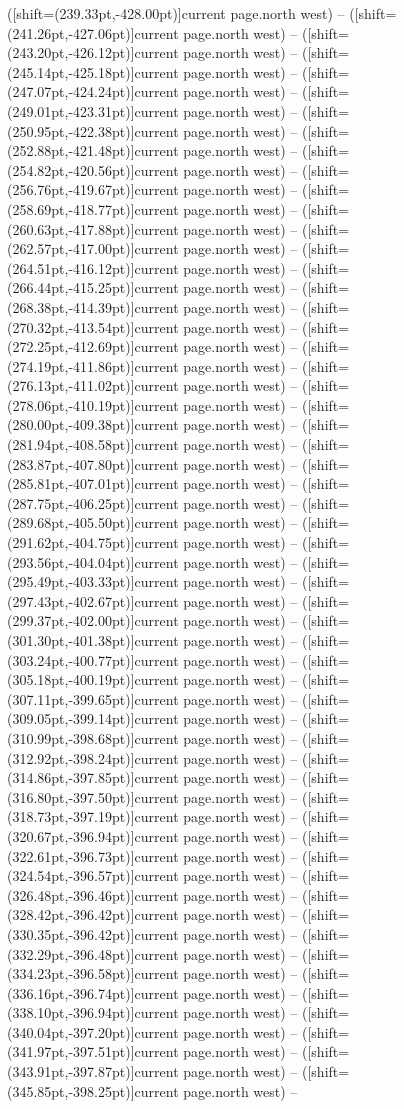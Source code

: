 \documentclass[11pt]{article}
\begin{document}
([shift={(239.33pt,-428.00pt)}]current page.north west) -- ([shift={(241.26pt,-427.06pt)}]current page.north west) -- ([shift={(243.20pt,-426.12pt)}]current page.north west) -- ([shift={(245.14pt,-425.18pt)}]current page.north west) -- ([shift={(247.07pt,-424.24pt)}]current page.north west) -- ([shift={(249.01pt,-423.31pt)}]current page.north west) -- ([shift={(250.95pt,-422.38pt)}]current page.north west) -- ([shift={(252.88pt,-421.48pt)}]current page.north west) -- ([shift={(254.82pt,-420.56pt)}]current page.north west) -- ([shift={(256.76pt,-419.67pt)}]current page.north west) -- ([shift={(258.69pt,-418.77pt)}]current page.north west) -- ([shift={(260.63pt,-417.88pt)}]current page.north west) -- ([shift={(262.57pt,-417.00pt)}]current page.north west) -- ([shift={(264.51pt,-416.12pt)}]current page.north west) -- ([shift={(266.44pt,-415.25pt)}]current page.north west) -- ([shift={(268.38pt,-414.39pt)}]current page.north west) -- ([shift={(270.32pt,-413.54pt)}]current page.north west) -- ([shift={(272.25pt,-412.69pt)}]current page.north west) -- ([shift={(274.19pt,-411.86pt)}]current page.north west) -- ([shift={(276.13pt,-411.02pt)}]current page.north west) -- ([shift={(278.06pt,-410.19pt)}]current page.north west) -- ([shift={(280.00pt,-409.38pt)}]current page.north west) -- ([shift={(281.94pt,-408.58pt)}]current page.north west) -- ([shift={(283.87pt,-407.80pt)}]current page.north west) -- ([shift={(285.81pt,-407.01pt)}]current page.north west) -- ([shift={(287.75pt,-406.25pt)}]current page.north west) -- ([shift={(289.68pt,-405.50pt)}]current page.north west) -- ([shift={(291.62pt,-404.75pt)}]current page.north west) -- ([shift={(293.56pt,-404.04pt)}]current page.north west) -- ([shift={(295.49pt,-403.33pt)}]current page.north west) -- ([shift={(297.43pt,-402.67pt)}]current page.north west) -- ([shift={(299.37pt,-402.00pt)}]current page.north west) -- ([shift={(301.30pt,-401.38pt)}]current page.north west) -- ([shift={(303.24pt,-400.77pt)}]current page.north west) -- ([shift={(305.18pt,-400.19pt)}]current page.north west) -- ([shift={(307.11pt,-399.65pt)}]current page.north west) -- ([shift={(309.05pt,-399.14pt)}]current page.north west) -- ([shift={(310.99pt,-398.68pt)}]current page.north west) -- ([shift={(312.92pt,-398.24pt)}]current page.north west) -- ([shift={(314.86pt,-397.85pt)}]current page.north west) -- ([shift={(316.80pt,-397.50pt)}]current page.north west) -- ([shift={(318.73pt,-397.19pt)}]current page.north west) -- ([shift={(320.67pt,-396.94pt)}]current page.north west) -- ([shift={(322.61pt,-396.73pt)}]current page.north west) -- ([shift={(324.54pt,-396.57pt)}]current page.north west) -- ([shift={(326.48pt,-396.46pt)}]current page.north west) -- ([shift={(328.42pt,-396.42pt)}]current page.north west) -- ([shift={(330.35pt,-396.42pt)}]current page.north west) -- ([shift={(332.29pt,-396.48pt)}]current page.north west) -- ([shift={(334.23pt,-396.58pt)}]current page.north west) -- ([shift={(336.16pt,-396.74pt)}]current page.north west) -- ([shift={(338.10pt,-396.94pt)}]current page.north west) -- ([shift={(340.04pt,-397.20pt)}]current page.north west) -- ([shift={(341.97pt,-397.51pt)}]current page.north west) -- ([shift={(343.91pt,-397.87pt)}]current page.north west) -- ([shift={(345.85pt,-398.25pt)}]current page.north west) -- 
\end{document}

